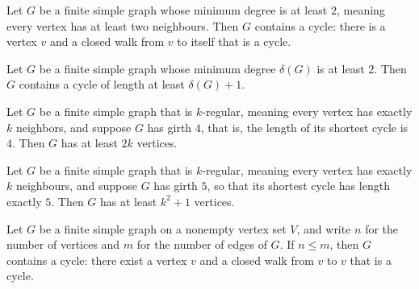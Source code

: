 \begin{theorem}
\label{SimpleGraph.exists_cycle_of_minDegree_ge_two}
\leanok
Let $G$ be a finite simple graph whose minimum degree is at least $2$, meaning every
vertex has at least two neighbours. Then $G$ contains a cycle: there is a vertex $v$ and
a closed walk from $v$ to itself that is a cycle.
\end{theorem}

\begin{theorem}
\label{SimpleGraph.exists_long_cycle_of_minDegree}
\leanok
Let $G$ be a finite simple graph whose minimum degree $\delta(G)$ is at least $2$. Then
$G$ contains a cycle of length at least $\delta(G) + 1$.
\end{theorem}

\begin{theorem}
\label{SimpleGraph.girth_four_regular_card_ge}
\leanok
Let $G$ be a finite simple graph that is $k$-regular, meaning every vertex has exactly
$k$ neighbors, and suppose $G$ has girth $4$, that is, the length of its shortest cycle
is $4$. Then $G$ has at least $2k$ vertices.
\end{theorem}

\begin{theorem}
\label{SimpleGraph.girth_five_regular_card_ge}
\leanok
Let $G$ be a finite simple graph that is $k$-regular, meaning every vertex has exactly
$k$ neighbours, and suppose $G$ has girth $5$, so that its shortest cycle has length
exactly $5$. Then $G$ has at least $k^2 + 1$ vertices.
\end{theorem}

\begin{theorem}
\label{SimpleGraph.exists_cycle_of_edgeCard_ge}
\leanok
Let $G$ be a finite simple graph on a nonempty vertex set $V$, and write $n$ for the
number of vertices and $m$ for the number of edges of $G$. If $n \le m$, then $G$
contains a cycle: there exist a vertex $v$ and a closed walk from $v$ to $v$ that is a
cycle.
\end{theorem}
